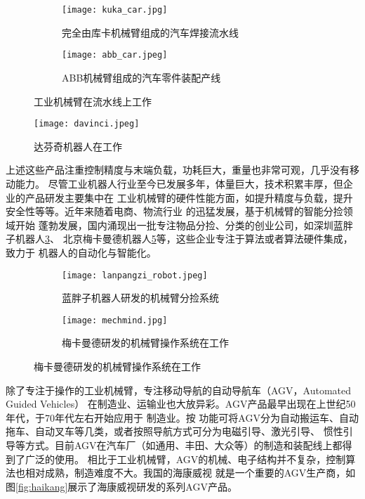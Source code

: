 \begin{figure}
\centering
\begin{subfigure}{.5\textwidth}
  \centering
  \texttt{[image: kuka\_car.jpg]}
  \caption{完全由库卡机械臂组成的汽车焊接流水线}
\end{subfigure}%
\begin{subfigure}{.5\textwidth}
  \centering
  \texttt{[image: abb\_car.jpeg]}
  \caption{ABB机械臂组成的汽车零件装配产线}
\end{subfigure}
\caption{工业机械臂在流水线上工作}
\label{fig:armcar}
\end{figure}

\begin{figure}[ht] %
  \centering
  \texttt{[image: davinci.jpeg]}
  \caption{达芬奇机器人在工作}
  \label{fig:davinci}
\end{figure}


上述这些产品注重控制精度与末端负载，功耗巨大，重量也非常可观，几乎没有移动能力。
尽管工业机器人行业至今已发展多年，体量巨大，技术积累丰厚，但企业的产品研发主要集中在
工业机械臂的硬件性能方面，如提升精度与负载，提升安全性等等。近年来随着电商、物流行业
的迅猛发展，基于机械臂的智能分捡领域开始
蓬勃发展，国内涌现出一批专注物品分捡、分类的创业公司，如深圳蓝胖子机器人\ref{fig:lanpangzi}、
北京梅卡曼德机器人\ref{fig:mechmind}等，这些企业专注于算法或者算法硬件集成，致力于
机器人的自动化与智能化。


\begin{figure}
\centering
\begin{subfigure}{.5\textwidth}
  \centering
  \texttt{[image: lanpangzi\_robot.jpeg]}
  \caption{蓝胖子机器人研发的机械臂分捡系统}
  \label{fig:lanpangzi}
\end{subfigure}%
\begin{subfigure}{.5\textwidth}
  \centering
  \texttt{[image: mechmind.jpg]}
  \caption{梅卡曼德研发的机械臂操作系统在工作}
  \label{fig:mechmind}
\end{subfigure}
\end{figure}

除了专注于操作的工业机械臂，专注移动导航的自动导航车（AGV，Automated Guided Vehicles）
在制造业、运输业也大放异彩。AGV产品最早出现在上世纪50年代，于70年代左右开始应用于
制造业\cite{黄志球2010自动导航车}。按
功能可将AGV分为自动搬运车、自动拖车、自动叉车等几类，或者按照导航方式可分为电磁引导、激光引导、
惯性引导等方式。目前AGV在汽车厂（如通用、丰田、大众等）的制造和装配线上都得到了广泛的使用。
相比于工业机械臂，AGV的机械、电子结构并不复杂，控制算法也相对成熟，制造难度不大。我国的海康威视
就是一个重要的AGV生产商，如图\ref{fig:haikang}展示了海康威视研发的系列AGV产品。

